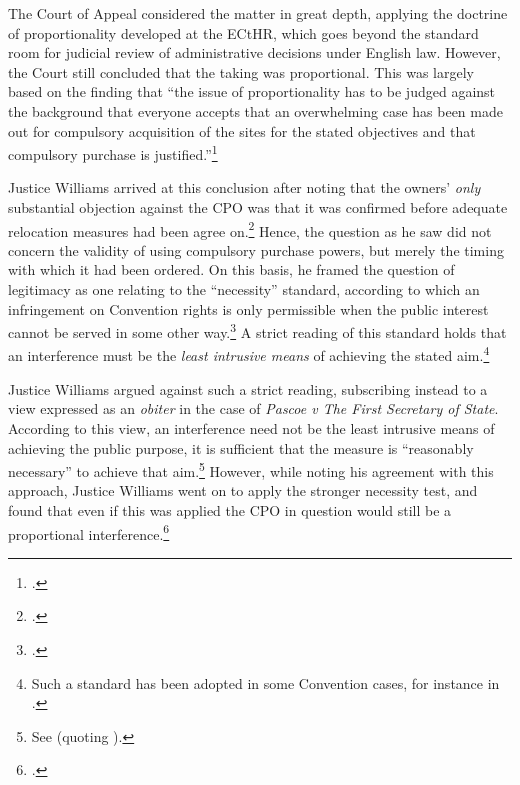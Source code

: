 \documentclass[12pt,a4paper]{book} %
\begin{document}
The Court of Appeal considered the matter in great depth, applying the doctrine of proportionality developed at the ECtHR, which goes beyond the standard room for judicial review of administrative decisions under English law. However, the Court still concluded that the taking was proportional. This was largely based on the finding that ``the issue of proportionality has to be judged against the background that everyone accepts that an overwhelming case has been made out for compulsory acquisition of the sites for the stated objectives and that compulsory purchase is justified.''\footcite[42]{smith08} 

Justice Williams arrived at this conclusion after noting that the owners' {\it only} substantial objection against the CPO was that it was confirmed before adequate relocation measures had been agree on.\footcite[42]{smith08} Hence, the question as he saw did not concern the validity of using compulsory purchase powers, but merely the timing with which it had been ordered. On this basis, he framed the question of legitimacy as one relating to the ``necessity'' standard, according to which an infringement on Convention rights is only permissible when the public interest cannot be served in some other way.\footcite[43]{smith08} A strict reading of this standard holds that an interference must be the {\it least intrusive means} of achieving the stated aim.\footnote{Such a standard has been adopted in some Convention cases, for instance in \cite{samaroo01}.}

Justice Williams argued against such a strict reading, subscribing instead to a view expressed as an {\it obiter} in the case of {\it Pascoe v The First Secretary of State}. According to this view, an interference need not be the least intrusive means of achieving the public purpose, it is sufficient that the measure is ``reasonably necessary'' to achieve that aim.\footnote{See \cite[74-75]{pascoe06} (quoting \cite[25]{clay04}).} However, while noting his agreement with this approach, Justice Williams went on to apply the stronger necessity test, and found that even if this was applied the CPO in question would still be a proportional interference.\footcite[41-50]{smith08}
\end{document}
